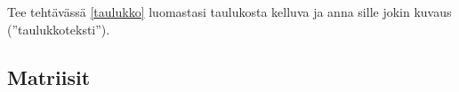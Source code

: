 %
%

\begin{fframe}
    \begin{harj}
        \label{kelluvaTaulukko}
        Tee tehtävässä \ref{taulukko} luomastasi taulukosta kelluva ja anna sille jokin kuvaus (''taulukkoteksti'').
    \end{harj}
\end{fframe}


\subsection{Matriisit}

